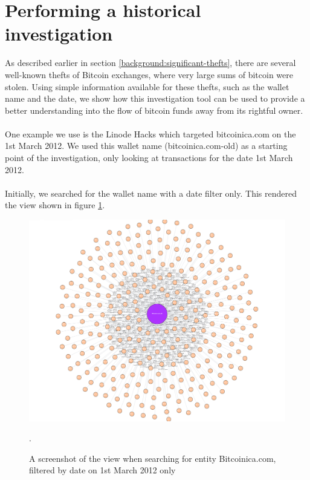 \section{Performing a historical investigation}
As described earlier in section \ref{background:significant-thefts}, there are several well-known thefts of Bitcoin exchanges, where very large sums of bitcoin were stolen. Using simple information available for these thefts, such as the wallet name and the date, we show how this investigation tool can be used to provide a better understanding into the flow of bitcoin funds away from its rightful owner.
\\\\
One example we use is the Linode Hacks which targeted bitcoinica.com on the 1st March 2012. We used this wallet name (bitcoinica.com-old) as a starting point of the investigation, only looking at transactions for the date 1st March 2012. 
\\\\
Initially, we searched for the wallet name with a date filter only. This rendered the view shown in figure \ref{fig:theft-no-filter}.

\begin{figure}[h!]
  \centering
  \includegraphics[width = 15cm]{./figures/theft-all-txs-1st-march}\\[0.5cm]
  \caption{A screenshot of the view when searching for entity Bitcoinica.com, filtered by date on 1st March 2012 only}.
  \label{fig:theft-no-filter}
\end{figure}

